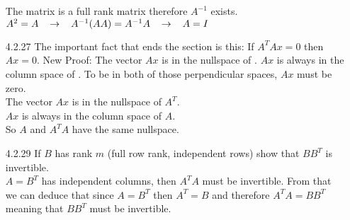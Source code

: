 \documentclass[10pt,twoside,reqno]{article}
\begin{document}
\begin{enumerate}
\vspace{3mm}
\begin{center}
The matrix is a full rank matrix therefore $A^{-1}$ exists. \\
$A^2=A \hspace{3mm} \rightarrow \hspace{3mm} A^{-1}(AA)=A^{-1}A \hspace{3mm} \rightarrow \hspace{3mm} A=I$ \\
\end{center}
\vspace{3mm}
\item[4.2.27] The important fact that ends the section is this: If $A^TAx = 0$ then $Ax = 0$. New Proof: The vector $Ax$ is in the nullspace of \underline{\hspace{8mm}}. $Ax$ is always in the column space of \underline{\hspace{8mm}}. To be in both of those perpendicular spaces, $Ax$ must be zero. \\
\vspace{3mm}
{\addtolength{\leftskip}{10mm}
The vector $Ax$ is in the nullspace of \underline{\hspace{3mm}$A^T$\hspace{3mm}}. \\
$Ax$ is always in the column space of \underline{\hspace{3mm}$A$\hspace{3mm}}. \\
So $A$ and $A^TA$ have the same nullspace. \\
}
\vspace{3mm}
\item[4.2.29] If $B$ has rank $m$ (full row rank, independent rows) show that $BB^T$ is invertible. \\
\vspace{3mm}
{\addtolength{\leftskip}{10mm}
$A=B^T$ has independent columns, then $A^TA$ must be invertible. From that we can deduce that since $A=B^T$ then $A^T=B$ and therefore $A^TA=BB^T$ meaning that $BB^T$ must be invertible. \\
}
\vspace{3mm}

\end{enumerate}
\end{document}
